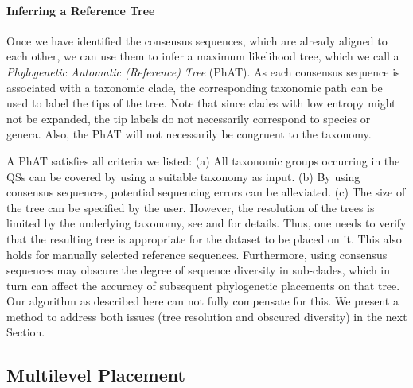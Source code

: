 \paragraph{Inferring a Reference Tree}
\label{ch:AutomaticTrees:sec:Methods:sub:PhAT:par:InferringReferenceTree}

Once we have identified the consensus sequences, which are already aligned to each other,
we can use them to infer a maximum likelihood tree, which we call a \emph{Phylogenetic Automatic (Reference) Tree} (PhAT).
As each consensus sequence is associated with a taxonomic clade,
the corresponding taxonomic path can be used to label the tips of the tree.
Note that since clades with low entropy might not be expanded, the tip labels do not necessarily correspond to species or genera.
Also, the \ac{PhAT} will not necessarily be congruent to the taxonomy.

A \ac{PhAT} satisfies all criteria we listed:
(a) All taxonomic groups occurring in the \acp{QS} can be covered by using a suitable taxonomy as input.
(b) By using consensus sequences, potential sequencing errors can be alleviated.
(c) The size of the tree can be specified by the user.
However, the resolution of the trees is limited by the underlying taxonomy,
see  and  for details.
Thus, one needs to verify that the resulting tree is appropriate for the dataset to be placed on it.
This also holds for manually selected reference sequences.
Furthermore, using consensus sequences may obscure the degree of sequence diversity in sub-clades,
which in turn can affect the accuracy of subsequent phylogenetic placements on that tree.
Our algorithm as described here can not fully compensate for this.
We present a method to address both issues (tree resolution and obscured diversity) in the next Section.


\subsection{Multilevel Placement}
\label{ch:AutomaticTrees:sec:Methods:sub:MultilevelPlacement}

